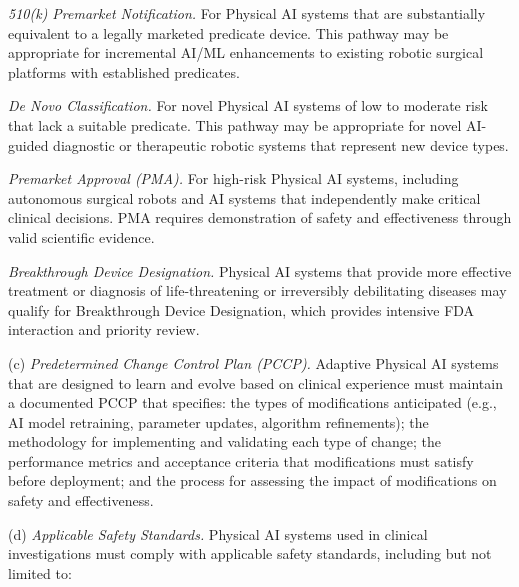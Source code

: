 \documentclass[11pt]{article}
\begin{document}
\begin{description}[leftmargin=1.0cm,style=sameline]
\item[(1)] \textit{510(k) Premarket Notification.} For Physical AI systems that are substantially equivalent to a legally marketed predicate device. This pathway may be appropriate for incremental AI/ML enhancements to existing robotic surgical platforms with established predicates.
\item[(2)] \textit{De Novo Classification.} For novel Physical AI systems of low to moderate risk that lack a suitable predicate. This pathway may be appropriate for novel AI-guided diagnostic or therapeutic robotic systems that represent new device types.
\item[(3)] \textit{Premarket Approval (PMA).} For high-risk Physical AI systems, including autonomous surgical robots and AI systems that independently make critical clinical decisions. PMA requires demonstration of safety and effectiveness through valid scientific evidence.
\item[(4)] \textit{Breakthrough Device Designation.} Physical AI systems that provide more effective treatment or diagnosis of life-threatening or irreversibly debilitating diseases may qualify for Breakthrough Device Designation, which provides intensive FDA interaction and priority review.
\end{description}

(c) \textit{Predetermined Change Control Plan (PCCP).} Adaptive Physical AI systems that are designed to learn and evolve based on clinical experience must maintain a documented PCCP that specifies: the types of modifications anticipated (e.g., AI model retraining, parameter updates, algorithm refinements); the methodology for implementing and validating each type of change; the performance metrics and acceptance criteria that modifications must satisfy before deployment; and the process for assessing the impact of modifications on safety and effectiveness.

(d) \textit{Applicable Safety Standards.} Physical AI systems used in clinical investigations must comply with applicable safety standards, including but not limited to:
\end{document}
